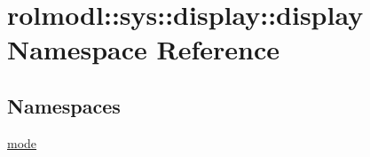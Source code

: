 \hypertarget{namespacerolmodl_1_1sys_1_1display_1_1display}{}\section{rolmodl\+::sys\+::display\+::display Namespace Reference}
\label{namespacerolmodl_1_1sys_1_1display_1_1display}
\subsection*{Namespaces}
\begin{DoxyCompactItemize}
\item 
 \mbox{\hyperlink{namespacerolmodl_1_1sys_1_1display_1_1display_1_1mode}{mode}}
\end{DoxyCompactItemize}
